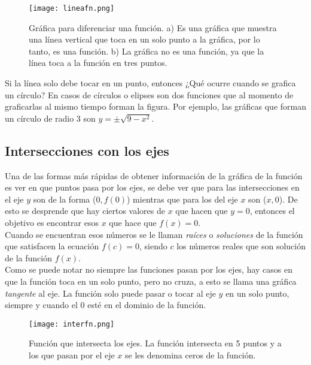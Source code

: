\begin{center}
\begin{figure}[h!]
\centering
\texttt{[image: lineafn.png]}
\caption[Gráfica para diferenciar una función.]{Gráfica para diferenciar una función. a) Es una gráfica que muestra una línea vertical que toca en un solo punto a la gráfica, por lo tanto, es una función. b) La gráfica no es una función, ya que la línea toca a la función en tres puntos.}
\label{difx}
\end{figure}
\end{center}
Si la línea solo debe tocar en un punto, entonces ¿Qué ocurre cuando se grafica un círculo? En casos de círculos o elipses son dos funciones que al momento de graficarlas al mismo tiempo forman la figura. Por ejemplo, las gráficas que forman un círculo de radio 3 son $y=\pm\sqrt{9-x^{2}}$. 

\subsection{Intersecciones con los ejes}
Una de las formas más rápidas de obtener información de la gráfica de la función es ver en que puntos pasa por los ejes, se debe ver que para las intersecciones en el eje $y$ son de la forma ($0,f(0)$) mientras que para los del eje $x$ son ($x,0$). De esto se desprende que hay ciertos valores de $x$ que hacen que $y=0$, entonces el objetivo es encontrar esos $x$ que hace que $f(x)=0$. \\
Cuando se encuentran esos números se le llaman \textit{raíces} o \textit{soluciones} de la función que satisfacen la ecuación $f(c)=0$, siendo $c$ los números reales que son solución de la función $f(x)$.\\

Como se puede notar no siempre las funciones pasan por los ejes, hay casos en que la función toca en un solo punto, pero no cruza, a esto se llama una gráfica \textit{tangente} al eje. La función solo puede pasar o tocar al eje $y$ en un solo punto, siempre y cuando el $0$ esté en el dominio de la función.\\ 

\begin{center}
\begin{figure}[h!]
\centering
\texttt{[image: interfn.png]}
\caption[Función que intersecta los ejes.]{Función que intersecta los ejes. La función intersecta en 5 puntos y a los que pasan por el eje $x$ se les denomina ceros de la función. }
\label{interfx}
\end{figure}
\end{center}

